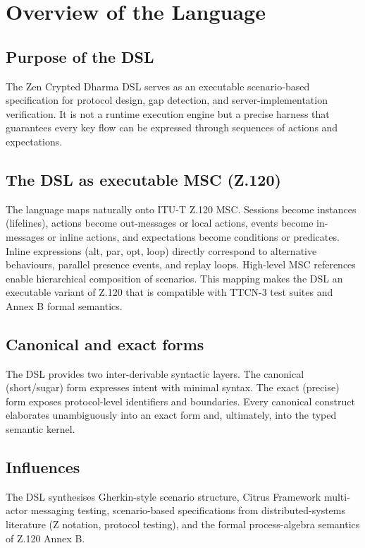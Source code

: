 \documentclass{article}
\begin{document}
\section{Overview of the Language}

\subsection{Purpose of the DSL}

The Zen Crypted Dharma DSL serves as an executable scenario-based specification for protocol design,
gap detection, and server-implementation verification. It is not a runtime execution engine but a
precise harness that guarantees every key flow can be expressed through sequences of actions and expectations.

\subsection{The DSL as executable MSC (Z.120)}

The language maps naturally onto ITU-T Z.120 MSC. Sessions become instances (lifelines), actions become
out-messages or local actions, events become in-messages or inline actions, and expectations become
conditions or predicates. Inline expressions (alt, par, opt, loop) directly correspond to alternative
behaviours, parallel presence events, and replay loops. High-level MSC references enable hierarchical
composition of scenarios. This mapping makes the DSL an executable variant of Z.120 that is compatible
with TTCN-3 test suites and Annex B formal semantics.

\subsection{Canonical and exact forms}

The DSL provides two inter-derivable syntactic layers. The canonical (short/sugar) form expresses intent
with minimal syntax. The exact (precise) form exposes protocol-level identifiers and boundaries. Every
canonical construct elaborates unambiguously into an exact form and, ultimately, into the typed semantic kernel.

\subsection{Influences}

The DSL synthesises Gherkin-style scenario structure, Citrus Framework multi-actor messaging testing,
scenario-based specifications from distributed-systems literature (Z notation, protocol testing),
and the formal process-algebra semantics of Z.120 Annex B.
\end{document}
